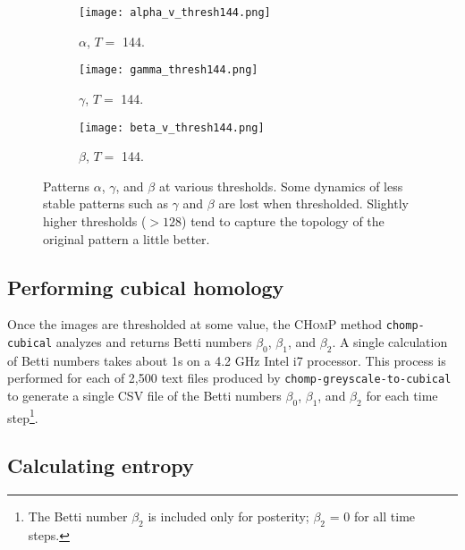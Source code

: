 \begin{figure}[h]
        \begin{subfigure}[b]{0.25\textwidth}
                \texttt{[image: alpha\_v\_thresh144.png]}
                \caption{$\alpha$, $T =$ 144.}
                \label{fig:alpha_144}
        \end{subfigure} \quad
         \begin{subfigure}[b]{0.25\textwidth}
                \texttt{[image: gamma\_thresh144.png]}
                \caption{$\gamma$, $T =$ 144.}
                \label{fig:gamma_144}
        \end{subfigure} \quad
         \begin{subfigure}[b]{0.25\textwidth}
                \texttt{[image: beta\_v\_thresh144.png]}
                \caption{$\beta$, $T =$ 144.}
                \label{fig:beta_144}
        \end{subfigure} \hfill
        \caption{Patterns $\alpha$, $\gamma$, and $\beta$ at various thresholds. Some dynamics of less stable patterns such as $\gamma$ and $\beta$ are lost when thresholded. Slightly higher thresholds ($>128$) tend to capture the topology of the original pattern a little better.}\label{fig:thresholds}
\end{figure}

\subsection{Performing cubical homology}

Once the images are thresholded at some value, the \textsc{CHomP} method \texttt{chomp-cubical} analyzes and returns Betti numbers $\beta_0$, $\beta_1$, and $\beta_2$.  A single calculation of Betti numbers takes about 1s on a 4.2 GHz Intel i7 processor. This process is performed for each of 2,500 text files produced by \texttt{chomp-greyscale-to-cubical} to generate a single CSV file of the Betti numbers $\beta_0$, $\beta_1$, and $\beta_2$ for each time step\footnote{The Betti number $\beta_2$ is included only for posterity; $\beta_2$ = 0 for all time steps.}.

\subsection{Calculating entropy}

